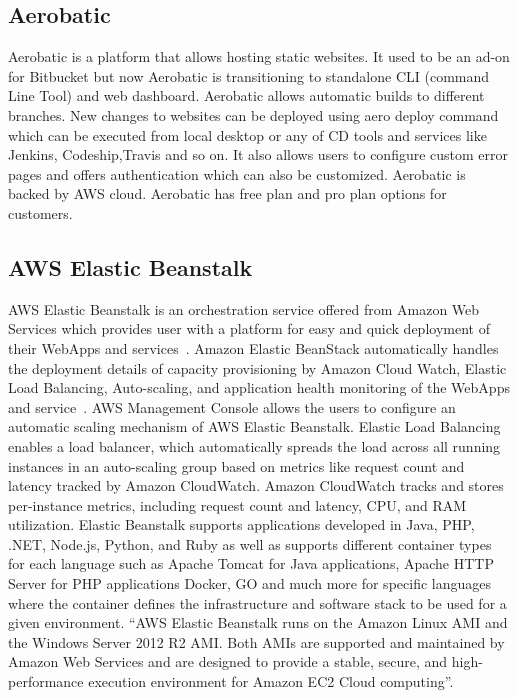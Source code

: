 \subsection{Aerobatic}

    Aerobatic is a platform that allows
    hosting static websites\cite{www-aero}. It used to be an ad-on for
    Bitbucket but
    now Aerobatic is transitioning to standalone CLI (command Line
    Tool) and web dashboard. Aerobatic allows automatic builds to
    different branches. New changes to websites can be deployed using
    aero deploy command which can be executed from local desktop or
    any of CD tools and services like Jenkins, Codeship,Travis and so
    on.  It also allows users to configure custom error pages and
    offers authentication which can also be customized. Aerobatic is
    backed by AWS cloud. Aerobatic has free plan and pro plan options
    for customers.

    \pv

\subsection{AWS Elastic Beanstalk}

AWS Elastic Beanstalk is an orchestration service offered from Amazon
Web Services which provides user with a platform for easy and quick
deployment of their WebApps and
services~\cite{www-amazon-elastic-beanstalk}. Amazon Elastic BeanStack
automatically handles the deployment details of capacity provisioning
by Amazon Cloud Watch, Elastic Load Balancing, Auto-scaling, and
application health monitoring of the WebApps and
service~\cite{amazon-elastic-beanstalk-book}. AWS Management Console
allows the users to configure an automatic scaling mechanism of AWS
Elastic Beanstalk. Elastic Load Balancing enables a load balancer,
which automatically spreads the load across all running instances in
an auto-scaling group based on metrics like request count and latency
tracked by Amazon CloudWatch. Amazon CloudWatch tracks and stores
per-instance metrics, including request count and latency, CPU, and
RAM utilization. Elastic Beanstalk supports applications developed in
Java, PHP, .NET, Node.js, Python, and Ruby as well as supports
different container types for each language such as Apache Tomcat for
Java applications, Apache HTTP Server for PHP applications Docker, GO
and much more for specific languages where the container defines the
infrastructure and software stack to be used for a given
environment. ``AWS Elastic Beanstalk runs on the Amazon Linux AMI and
the Windows Server 2012 R2 AMI. Both AMIs are supported and maintained
by Amazon Web Services and are designed to provide a stable, secure,
and high-performance execution environment for Amazon EC2 Cloud
computing''\cite{www-amazon-elastic-beanstalk}.

